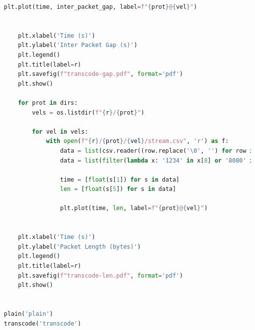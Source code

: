 \documentclass{exam}
\begin{document}
\begin{lstlisting}[language=python]
                plt.plot(time, inter_packet_gap, label=f"{prot}@{vel}")
                    

    plt.xlabel('Time (s)')
    plt.ylabel('Inter Packet Gap (s)')
    plt.legend()
    plt.title(label=r)
    plt.savefig(f"transcode-gap.pdf", format='pdf')
    plt.show()

    for prot in dirs:
        vels = os.listdir(f"{r}/{prot}")

        for vel in vels:
            with open(f"{r}/{prot}/{vel}/stream.csv", 'r') as f:
                data = list(csv.reader((row.replace('\0', '') for row in f), delimiter=','))
                data = list(filter(lambda x: '1234' in x[8] or '8080' in x[7], data[1:]))

                time = [float(s[1]) for s in data]
                len = [float(s[5]) for s in data]
                
                plt.plot(time, len, label=f"{prot}@{vel}")
                    

    plt.xlabel('Time (s)')
    plt.ylabel('Packet Length (bytes)')
    plt.legend()
    plt.title(label=r)
    plt.savefig(f"transcode-len.pdf", format='pdf')
    plt.show()


plain('plain')
transcode('transcode')
\end{lstlisting}
\end{document}
